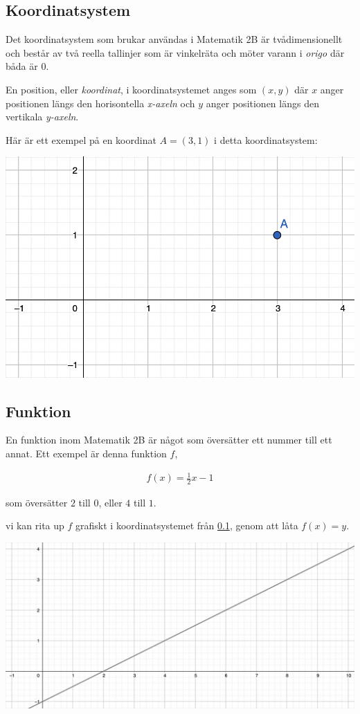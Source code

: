 \subsection{Koordinatsystem}
\label{Koordinatsystem}

Det koordinatsystem som brukar användas i Matematik 2B är tvådimensionellt och består av två reella tallinjer som är vinkelräta och möter varann i \textit{origo} där båda är $0$.

En position, eller \textit{koordinat}, i koordinatsystemet anges som $(x, y)$ där $x$ anger positionen längs den horisontella \textit{x-axeln} och $y$ anger positionen längs den vertikala \textit{y-axeln}.

Här är ett exempel på en koordinat $A = (3, 1)$ i detta koordinatsystem:

\includegraphics[width=\textwidth]{img/1.png}

\subsection{Funktion}

En funktion inom Matematik 2B är något som översätter ett nummer till ett annat. Ett exempel är denna funktion $f$,

\begin{align}
	f(x) = \frac{1}{2}x-1
\end{align}

som översätter $2$ till $0$, eller $4$ till $1$.

vi kan rita up $f$ grafiskt i koordinatsystemet från \ref{Koordinatsystem}, genom att låta $f(x) = y$.

\includegraphics[width=\textwidth]{img/2.png}